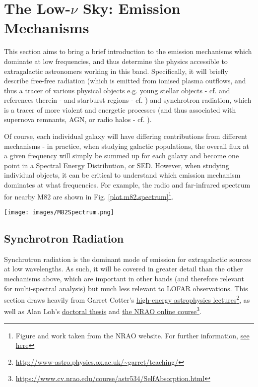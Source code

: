 
\section{The Low-$\nu$ Sky: Emission Mechanisms}
\pg
This section aims to bring a brief introduction to the emission mechanisms which dominate at low frequencies, and thus determine the physics accessible to extragalactic astronomers working in this band. Specifically, it will briefly describe
free-free radiation (which is emitted from ionised plasma outflows, and thus a tracer of various physical objects e.g. young stellar objects - cf. \citet{2017ApJ...834..206C} and references therein - and starburst regions - cf. \citet{2015A&A...574A.114V}) and synchrotron radiation, which is a tracer of more violent and energetic processes (and thus associated with supernova remnants, AGN, or radio halos - cf. \citet{2010A&A...509A..68C}).

\pg
Of course, each individual galaxy will have differing contributions from different mechanisms - in practice, when studying galactic populations, the overall flux at a given frequency will simply be summed up for each galaxy and become one point in a Spectral Energy Distribution, or SED. However, when studying individual objects, it can be critical to understand which emission mechanism dominates at what frequencies. For example, the radio and far-infrared spectrum for nearby M82 are shown in Fig. \ref{plot.m82.spectrum}\footnote{Figure and work taken from the NRAO website. For further information, \href{https://www.cv.nrao.edu/course/astr534/FreeFreeEmission.html}{see here}}.
\begin{figure*}[!h]
\centering
\texttt{[image: images/M82Spectrum.png]}
\caption{\label{plot.m82.spectrum} Radio and far-infrared spectrum for galaxy M82, as estimated \href{https://www.cv.nrao.edu/course/astr534/FreeFreeEmission.html}{by the NRAO online course} (\url{https://www.cv.nrao.edu/course/astr534/FreeFreeEmission.html}). The flat curve corresponds to free-free emission, while synchrotron radiation and thermal dust emission dominate at low and high frequencies respectively.}
\end{figure*}


\subsection{Synchrotron Radiation}

\pg
Synchrotron radiation is the dominant mode of emission for extragalactic sources at low wavelengths. As such, it will be covered in greater detail than the other mechanisms above, which are important in other bands (and therefore relevant for multi-spectral analysis) but much less relevant to LOFAR observations. This section draws heavily from Garret Cotter's \href{http://www-astro.physics.ox.ac.uk/~garret/teaching/}{high-energy astrophysics lectures}\footnote{\url{http://www-astro.physics.ox.ac.uk/~garret/teaching/}}, as well as Alan Loh's \href{http://theses.md.univ-paris-diderot.fr/LOH_Alan_2_va_20160930.pdf}{doctoral thesis}  and \href{https://www.cv.nrao.edu/course/astr534/SelfAbsorption.html}{the NRAO online course}\footnote{\url{https://www.cv.nrao.edu/course/astr534/SelfAbsorption.html}}.

